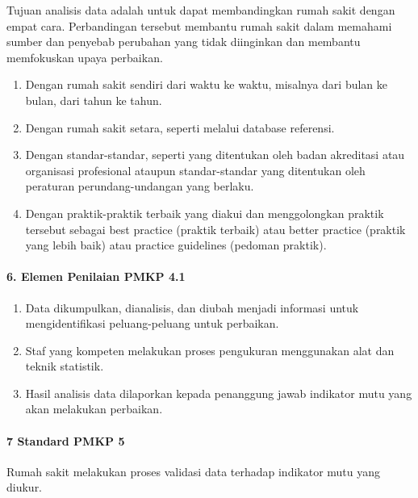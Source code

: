 \documentclass[
]{book}
\providecommand{\tightlist}{%
  \setlength{\itemsep}{0pt}\setlength{\parskip}{0pt}}
\begin{document}
Tujuan analisis data adalah untuk dapat membandingkan rumah sakit dengan empat cara. Perbandingan tersebut membantu rumah sakit dalam memahami sumber dan penyebab perubahan yang tidak diinginkan dan membantu memfokuskan upaya perbaikan.

\begin{enumerate}
\def\labelenumi{\alph{enumi}.}
\tightlist
\item
  Dengan rumah sakit sendiri dari waktu ke waktu, misalnya dari bulan ke bulan, dari tahun ke tahun.
\item
  Dengan rumah sakit setara, seperti melalui database referensi.
\item
  Dengan standar-standar, seperti yang ditentukan oleh badan akreditasi atau organisasi profesional ataupun standar-standar yang ditentukan oleh peraturan perundang-undangan yang berlaku.
\item
  Dengan praktik-praktik terbaik yang diakui dan menggolongkan praktik tersebut sebagai best practice (praktik terbaik) atau better practice (praktik yang lebih baik) atau practice guidelines (pedoman praktik).
\end{enumerate}

\hypertarget{elemen-penilaian-pmkp-4.1}{%
\paragraph*{6. Elemen Penilaian PMKP 4.1}\label{elemen-penilaian-pmkp-4.1}}

\begin{enumerate}
\def\labelenumi{\alph{enumi}.}
\tightlist
\item
  Data dikumpulkan, dianalisis, dan diubah menjadi informasi untuk mengidentifikasi peluang-peluang untuk perbaikan.
\item
  Staf yang kompeten melakukan proses pengukuran menggunakan alat dan teknik statistik.
\item
  Hasil analisis data dilaporkan kepada penanggung jawab indikator mutu yang akan melakukan perbaikan.
\end{enumerate}

\hypertarget{standard-pmkp-5}{%
\paragraph*{7 Standard PMKP 5}\label{standard-pmkp-5}}

Rumah sakit melakukan proses validasi data terhadap indikator mutu yang diukur.
\end{document}
